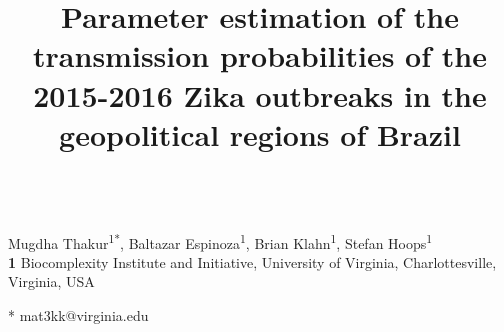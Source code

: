 \documentclass[10pt,letterpaper]{article}
\title{Parameter estimation of the transmission probabilities of the 2015-2016 Zika outbreaks in the geopolitical regions of Brazil}
\author{}
\date{}
\begin{document}
\vspace*{0.2in}

\begin{flushleft}
{\Large
\textbf{} %
}
\newline
\\
Mugdha Thakur\textsuperscript{1*},
Baltazar Espinoza\textsuperscript{1},
Brian Klahn\textsuperscript{1},
Stefan Hoops\textsuperscript{1}
\\
\bigskip
\textbf{1} Biocomplexity Institute and Initiative, University of Virginia, Charlottesville, Virginia, USA
\\
\bigskip

% 
%





* mat3kk@virginia.edu

\end{flushleft}
\end{document}
